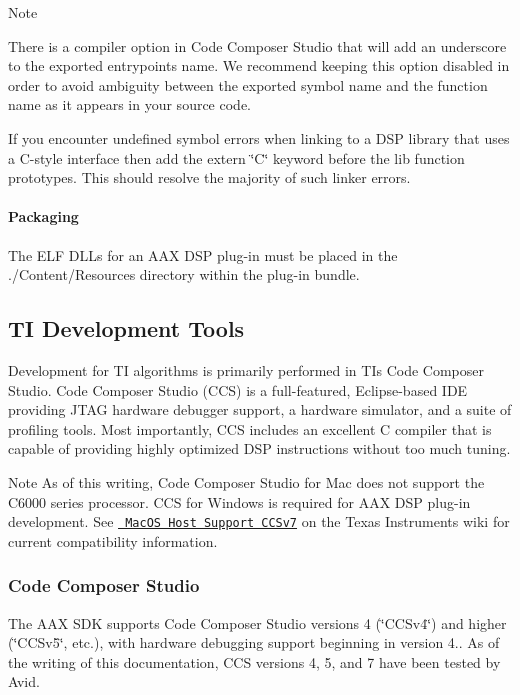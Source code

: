 \begin{DoxyNote}{Note}

\begin{DoxyItemize}
\item There is a compiler option in Code Composer Studio that will add an underscore to the exported entrypoint\textquotesingle{}s name. We recommend keeping this option disabled in order to avoid ambiguity between the exported symbol name and the function name as it appears in your source code.  
\item If you encounter undefined symbol errors when linking to a D\+SP library that uses a C-\/style interface then add the extern \char`\"{}\+C\char`\"{} keyword before the lib function prototypes. This should resolve the majority of such linker errors. 
\end{DoxyItemize}
\end{DoxyNote}
\hypertarget{a00832_subsubsection__packaging_}{}\paragraph{Packaging}\label{a00832_subsubsection__packaging_}
 The E\+LF D\+L\+Ls for an A\+AX D\+SP plug-\/in must be placed in the ./\+Content/\+Resources directory within the plug-\/in bundle. 

 \hypertarget{a00832_aax_ti_guide_04_ti_development_tools}{}\subsection{T\+I Development Tools}\label{a00832_aax_ti_guide_04_ti_development_tools}
Development for TI algorithms is primarily performed in TI\textquotesingle{}s Code Composer Studio. Code Composer Studio (C\+CS) is a full-\/featured, Eclipse-\/based I\+DE providing J\+T\+AG hardware debugger support, a hardware simulator, and a suite of profiling tools. Most importantly, C\+CS includes an excellent C compiler that is capable of providing highly optimized D\+SP instructions without too much tuning.

 \begin{DoxyNote}{Note}
As of this writing, Code Composer Studio for Mac does not support the C6000 series processor. C\+CS for Windows is required for A\+AX D\+SP plug-\/in development. See \href{http://processors.wiki.ti.com/index.php/MacOS_Host_Support_CCSv7}{\texttt{ Mac\+OS Host Support C\+C\+Sv7}} on the Texas Instruments wiki for current compatibility information.
\end{DoxyNote}
\hypertarget{a00832_subsection__code_composer_studio}{}\subsubsection{Code Composer Studio}\label{a00832_subsection__code_composer_studio}
The A\+AX S\+DK supports Code Composer Studio versions 4 (\char`\"{}\+C\+C\+Sv4\char`\"{}) and higher (\char`\"{}\+C\+C\+Sv5\char`\"{}, etc.), with hardware debugging support beginning in version 4.. As of the writing of this documentation, C\+CS versions 4, 5, and 7 have been tested by Avid.

